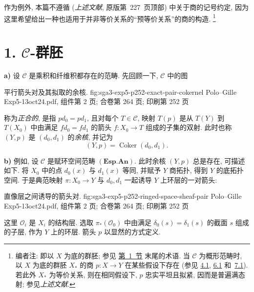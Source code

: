 作为例外, 本篇不遵循 
(\emph{上述文献}, 原版第~227~页顶部) 中关于商的记号约定,
因为这里希望给出一种也适用于并非等价关系的``预等价关系''的商的构造.%
\footnote{\label{note:sga3-V-2}编者注: 即以 \(X\) 为底的群胚;
参见 \hyperref[sec:sga3-V-1]{第~1~节} 末尾的术语.
当 \(\mathscr C\) 为概形范畴时, 以 \(X\) 为底的群胚 \(X_\ast\)
的商 \(p:X\to Y\) 在某些假设下存在
(参见 \hyperref[thm:sga3-V-4.1]{4.1}, \hyperref[lem:sga3-V-6.1]{6.1}
和~\hyperref[thm:sga3-V-7.1]{7.1}). 若此外 \(X_\ast\) 为等价关系,
则在相同假设下, \(p\) 忠实平坦且拟紧, 因而是普遍满态射;
参见\emph{上述文献}.}

\section*{1. \(\mathscr C\)-群胚}
\label{sec:sga3-V-1}

\label{par:sga3-V-1-a}%
\noindent\textbf{a)} 设 \(\mathscr C\) 是乘积和纤维积都存在的范畴.
先回顾一下, \(\mathscr C\) 中的图

  {平行箭头对及其拟取的余核.}
  {fig:sga3-exp5-p252-exact-pair-cokernel}
  {Polo--Gille Exp5-13oct24.pdf, 组件第 2 页; 合卷第 264 页; 印刷第 252 页}

\noindent 称为\emph{正合的}, 是指 \(p d_0=p d_1\),
且对每个 \(T\in\mathscr C\), 映射 \(T(p)\) 是从 \(T(Y)\)
到 \(T(X_0)\) 中由满足 \(f d_0=f d_1\) 的箭头 \(f:X_0\to T\)
组成的子集的双射. 此时也称 \((Y,p)\) 是 \((d_0,d_1)\) 的\emph{余核},
并记为
\label{eq:sga3-V-1-cokernel}%
\begin{equation*}
  (Y,p)=\operatorname{Coker}(d_0,d_1).
\end{equation*}

\label{par:sga3-V-1-b}%
\noindent\textbf{b)} 例如, 设 \(\mathscr C\) 是赋环空间范畴
\((\mathbf{Esp.An})\). 此时余核 \((Y,p)\) 总是存在, 可描述如下.
将 \(X_0\) 中的点 \(d_0(x)\) 与 \(d_1(x)\) 等同,
并赋予 \(Y\) 商拓扑, 得到 \(Y\) 的底拓扑空间.
于是典范映射 \(\pi:X_0\to Y\) 与 \(d_0,d_1\)
一起诱导 \(Y\) 上环层的一对箭头:

  {直像层之间诱导的箭头对.}
  {fig:sga3-exp5-p252-ringed-space-sheaf-pair}
  {Polo--Gille Exp5-13oct24.pdf, 组件第 2 页; 合卷第 264 页; 印刷第 252 页}

这里 \(\mathcal O_i\) 是 \(X_i\) 的结构层.
选取 \(\pi_*(\mathcal O_0)\) 中由满足 \(\delta_0(s)=\delta_1(s)\)
的截面 \(s\) 组成的子层, 作为 \(Y\) 上的环层.
箭头 \(p\) 以显然的方式定义.

